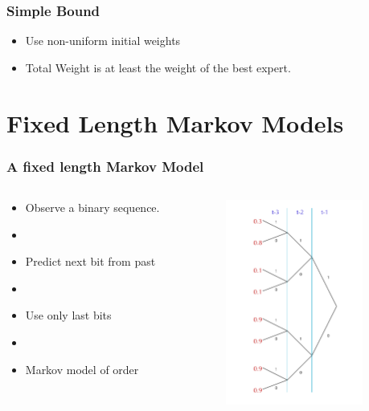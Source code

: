 \documentclass[handout]{beamer}
\begin{document}
\begin{frame}
\frametitle{Simple Bound}
\begin{itemize}
\item Use non-uniform initial weights 
\item Total Weight is at least the weight of the best expert.
\end{itemize}
\end{frame}

\section{Fixed Length Markov Models}

\begin{frame}
\frametitle{A fixed length Markov Model}
\begin{columns}
\begin{column}[t]{8cm}
\begin{itemize}
\item Observe a binary sequence.
\item {}
\item Predict next bit from past
\item {}
\item Use only last  bits
\item {}
\item Markov model of order 
\end{itemize}
\end{column}
\begin{column}[T]{5cm}
\includegraphics[width=4.5cm]{figures/PredictionTree.pdf}
\end{column}
\end{columns}
\end{frame}
\end{document}
